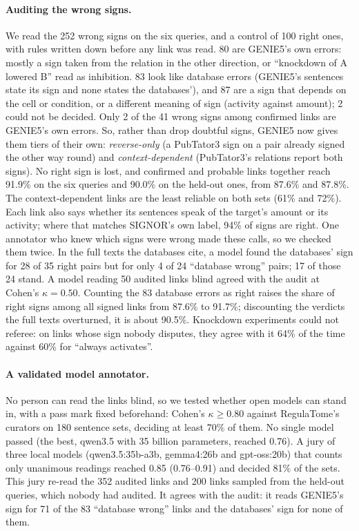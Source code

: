 \documentclass[11pt,a4paper]{article}
\newcommand{\gen}{GENIE5}
\begin{document}
\paragraph{Auditing the wrong signs.} We read the 252 wrong signs on the six queries, and a
control of 100 right ones, with rules written down before any link was read. 80 are \gen{}'s own
errors: mostly a sign taken from the relation in the other direction, or ``knockdown of A lowered
B'' read as inhibition. 83 look like database errors (\gen{}'s sentences state its sign and none
states the databases'), and 87 are a sign that depends on the cell or condition, or a different
meaning of sign (activity against amount); 2 could not be decided. Only 2 of the 41 wrong signs among confirmed links are
\gen{}'s own errors. So, rather than drop doubtful signs, \gen{} now gives them tiers of their own:
\emph{reverse-only} (a PubTator3 sign on a pair already signed the other way round) and
\emph{context-dependent} (PubTator3's relations report both signs). No right sign is lost, and
confirmed and probable links together reach 91.9\% on the six queries and 90.0\% on the held-out
ones, from 87.6\% and 87.8\%. The context-dependent links are the least reliable on both sets
(61\% and 72\%). Each link also says whether its sentences speak of the target's amount or its
activity; where that matches SIGNOR's own label, 94\% of signs are right. One annotator who knew
which signs were wrong made these calls, so we checked them twice. In the full texts the databases
cite, a model found the databases' sign for 28 of 35 right pairs but for only 4 of 24 ``database
wrong'' pairs; 17 of those 24 stand. A model reading 50 audited links blind agreed with the audit
at Cohen's $\kappa = 0.50$. Counting the 83 database errors as right raises the share of right
signs among all signed links from 87.6\% to 91.7\%; discounting the verdicts the full texts overturned, it is
about 90.5\%. Knockdown experiments could not referee: on links
whose sign nobody disputes, they agree with it 64\% of the time against 60\% for ``always
activates''.

\paragraph{A validated model annotator.} No person can read the links blind, so we tested whether
open models can stand in, with a pass mark fixed beforehand: Cohen's $\kappa \geq 0.80$ against
RegulaTome's curators on 180 sentence sets, deciding at least 70\% of them. No single model passed
(the best, qwen3.5 with 35 billion parameters, reached 0.76). A jury of three local models
(qwen3.5:35b-a3b, gemma4:26b and gpt-oss:20b) that counts only unanimous readings reached 0.85
(0.76--0.91) and decided 81\% of the sets. This jury re-read the 352 audited links and 200 links
sampled from the held-out queries, which nobody had audited. It agrees with the audit: it reads
\gen{}'s sign for 71 of the 83 ``database wrong'' links and the databases' sign for none of them.
\end{document}
